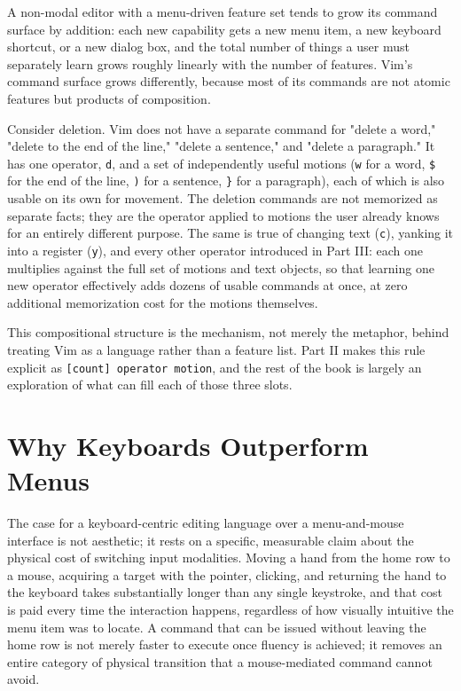 A non-modal editor with a menu-driven feature set tends to grow its command surface by addition: each new capability gets a new menu item, a new keyboard shortcut, or a new dialog box, and the total number of things a user must separately learn grows roughly linearly with the number of features. Vim's command surface grows differently, because most of its commands are not atomic features but products of composition.

Consider deletion. Vim does not have a separate command for "delete a word," "delete to the end of the line," "delete a sentence," and "delete a paragraph." It has one operator, \texttt{d}, and a set of independently useful motions (\texttt{w} for a word, \texttt{\$} for the end of the line, \texttt{)} for a sentence, \texttt{\}} for a paragraph), each of which is also usable on its own for movement. The deletion commands are not memorized as separate facts; they are the operator applied to motions the user already knows for an entirely different purpose. The same is true of changing text (\texttt{c}), yanking it into a register (\texttt{y}), and every other operator introduced in Part III: each one multiplies against the full set of motions and text objects, so that learning one new operator effectively adds dozens of usable commands at once, at zero additional memorization cost for the motions themselves.

This compositional structure is the mechanism, not merely the metaphor, behind treating Vim as a language rather than a feature list. Part II makes this rule explicit as \texttt{[count]\ operator\ motion}, and the rest of the book is largely an exploration of what can fill each of those three slots.

\section{Why Keyboards Outperform Menus}

The case for a keyboard-centric editing language over a menu-and-mouse interface is not aesthetic; it rests on a specific, measurable claim about the physical cost of switching input modalities. Moving a hand from the home row to a mouse, acquiring a target with the pointer, clicking, and returning the hand to the keyboard takes substantially longer than any single keystroke, and that cost is paid every time the interaction happens, regardless of how visually intuitive the menu item was to locate. A command that can be issued without leaving the home row is not merely faster to execute once fluency is achieved; it removes an entire category of physical transition that a mouse-mediated command cannot avoid.

